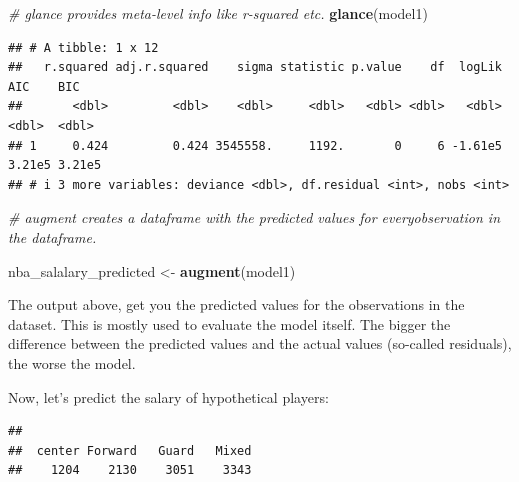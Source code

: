 \documentclass[
]{book}
\newenvironment{Shaded}{\begin{snugshade}}{\end{snugshade}}
\newcommand{\CommentTok}[1]{\textcolor[rgb]{0.56,0.35,0.01}{\textit{#1}}}
\newcommand{\FunctionTok}[1]{\textcolor[rgb]{0.13,0.29,0.53}{\textbf{#1}}}
\newcommand{\NormalTok}[1]{#1}
\newcommand{\OtherTok}[1]{\textcolor[rgb]{0.56,0.35,0.01}{#1}}
\newcommand{\SpecialCharTok}[1]{\textcolor[rgb]{0.81,0.36,0.00}{\textbf{#1}}}
\begin{document}
\begin{Shaded}
\begin{Highlighting}[]
\CommentTok{\# glance provides meta{-}level info like r{-}squared etc.}
\FunctionTok{glance}\NormalTok{(model1)}
\end{Highlighting}
\end{Shaded}

\begin{verbatim}
## # A tibble: 1 x 12
##   r.squared adj.r.squared    sigma statistic p.value    df  logLik    AIC    BIC
##       <dbl>         <dbl>    <dbl>     <dbl>   <dbl> <dbl>   <dbl>  <dbl>  <dbl>
## 1     0.424         0.424 3545558.     1192.       0     6 -1.61e5 3.21e5 3.21e5
## # i 3 more variables: deviance <dbl>, df.residual <int>, nobs <int>
\end{verbatim}

\begin{Shaded}
\begin{Highlighting}[]
\CommentTok{\# augment creates a dataframe with the predicted values for everyobservation in the dataframe. }

\NormalTok{nba\_salalary\_predicted }\OtherTok{\textless{}{-}} \FunctionTok{augment}\NormalTok{(model1)}
\end{Highlighting}
\end{Shaded}

The output above, get you the predicted values for the observations in the dataset. This is mostly used to evaluate the model itself. The bigger the difference between the predicted values and the actual values (so-called residuals), the worse the model.

Now, let's predict the salary of hypothetical players:

\begin{Shaded}
\end{Shaded}

\begin{verbatim}
## 
##  center Forward   Guard   Mixed 
##    1204    2130    3051    3343
\end{verbatim}
\end{document}
